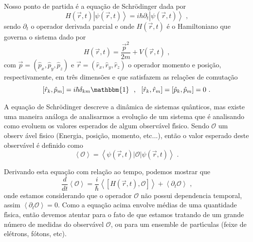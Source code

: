 \documentclass[twocolumn]{rbef}
\newcommand{\1}{\mathbbm{1}}
\begin{document}
Nosso ponto de partida \'{e} a equa\c{c}\~{a}o de Schr\"{o}dinger dada
por%
\begin{equation}
  H\left( \vec{r},t\right) \left\vert \psi \left( \vec{r},t\right)
  \right\rangle =i\hbar \partial _{t}\left\vert \psi \left( \vec{r},t\right)
  \right\rangle  \text{ ,} \label{schro}
\end{equation}%
sendo $\partial _{t}$ o operador derivada parcial e onde $%
H\left( \vec{r},t\right) $ \'{e} o Hamiltoniano que governa o sistema
dado por%
\begin{equation}
  H\left( \vec{r},t\right) =\frac{\vec{p}^{2}}{2m}+V\left( \vec{r},t\right) \text{ ,}
  \label{Hamil}
\end{equation}%
com $\vec{p}=\left( \hat{p}_{x},\hat{p}_{y},\hat{p}_{z}\right) $ e
$\vec{r}%
=\left( \hat{r}_{x},\hat{r}_{y},\hat{r}_{z}\right) $ o operador momento
e posi\c{c}\~{a}o, respectivamente, em tr\^{e}s dimens\~{o}es e que
satisfazem as rela\c{c}\~{o}es de comuta\c{c}\~{a}o%
\begin{equation}
  \left[ \hat{r}_{k},\hat{p}_{m}\right] =i\hbar \delta _{km}\1\text{ \ , \ }\left[
    \hat{r}_{k},\hat{r}_{m}\right] =\left[ \hat{p}_{k},\hat{p}_{m}\right] =0 \text{ .}
  \label{comu}
\end{equation}

A equa\c{c}\~{a}o de Schr\"{o}dinger descreve a din\^{a}mica de sistemas
qu\^{a}nticos, mas existe uma maneira an\'{a}loga de analisarmos a
evolu\c{c}\~{a}o de um sistema que \'{e} analisando como evoluem os
valores esperados de algum observ\'{a}vel f\'{\i}sico. Sendo
$\mathcal{O}$ um observ%
\'{a}vel fisico (Energia, posi\c{c}\~{a}o, momento, etc...), ent\~{a}o o
valor esperado deste observ\'{a}vel \'{e} definido como%
\begin{equation}
  \left\langle \mathcal{O}\right\rangle =\left\langle \psi \left( \vec{r}%
      ,t\right) |\mathcal{O}|\psi \left( \vec{r},t\right) \right\rangle \text{ .}
\end{equation}

Derivando esta equa\c{c}\~{a}o com rela\c{c}\~{a}o ao tempo, podemos
mostrar que%
\begin{equation}
  \frac{d}{dt}\left\langle \mathcal{O}\right\rangle =\frac{i}{\hbar }%
  \left\langle \left[ H\left( \vec{r},t\right) ,\mathcal{O}\right]
  \right\rangle +\left\langle \partial _{t}\mathcal{O}\right\rangle \text{ ,}
  \label{evO}
\end{equation}%
onde estamos considerando que o operador $\mathcal{O}$ n\~{a}o possui
dependencia temporal, assim $\left\langle \partial _{t}\mathcal{O}%
\right\rangle =0$. Como a equa\c{c}\~{a}o acima envolve m\'{e}dias de
uma quantidade f\'{\i}sica, ent\~{a}o devemos atentar para o fato de que
estamos tratando de um grande n\'{u}mero de medidas do observ\'{a}vel
$\mathcal{O}$, ou para um ensemble de part\'{\i}culas (feixe de
el\'{e}trons, f\'{o}tons, etc).
\end{document}
